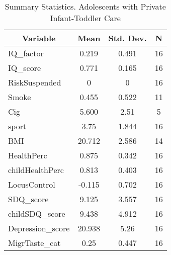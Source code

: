 
\begin{table}[htbp]\centering \caption{Summary Statistics. Adolescents with Private Infant-Toddler Care \label{schoolAdolasiloPriv}}
\begin{tabular}{l c c  c}\hline\hline
\multicolumn{1}{c}{\textbf{Variable}} & \textbf{Mean}
 & \textbf{Std. Dev.} & \textbf{N}\\ \hline
IQ\_factor & 0.219 & 0.491  & 16\\
IQ\_score & 0.771 & 0.165  & 16\\
RiskSuspended & 0 & 0  & 16\\
Smoke & 0.455 & 0.522  & 11\\
Cig & 5.600 & 2.51  & 5\\
sport & 3.75 & 1.844  & 16\\
BMI & 20.712 & 2.586  & 14\\
HealthPerc & 0.875 & 0.342  & 16\\
childHealthPerc & 0.813 & 0.403  & 16\\
LocusControl & -0.115 & 0.702  & 16\\
SDQ\_score & 9.125 & 3.557  & 16\\
childSDQ\_score & 9.438 & 4.912  & 16\\
Depression\_score & 20.938 & 5.26  & 16\\
MigrTaste\_cat & 0.25 & 0.447  & 16\\
\hline\end{tabular}
\end{table}

